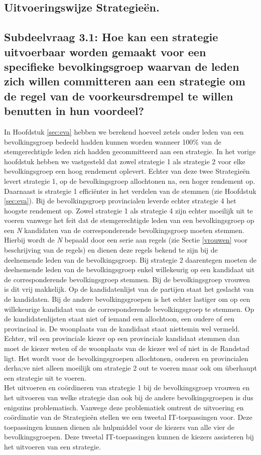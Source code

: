 \subsection{Uitvoeringswijze Strategie\"{e}n.}

\subsection*{Subdeelvraag 3.1: Hoe kan een strategie uitvoerbaar worden gemaakt voor een specifieke bevolkingsgroep waarvan de leden zich willen committeren aan een strategie om de regel van de voorkeursdrempel te willen benutten in hun voordeel?}
In Hoofdstuk \ref{sec:eva} hebben we berekend hoeveel zetels onder leden van een bevolkingsgroep bedeeld hadden kunnen worden wanneer 100\% van de stemgerechtigde leden zich hadden gecommitteerd aan een strategie. In het vorige hoofdstuk hebben we vastgesteld dat zowel strategie 1 als strategie 2 voor elke bevolkingsgroep een hoog rendement oplevert. Echter van deze twee Strategie\"{e}n levert strategie 1, op de bevolkingsgroep allochtonen na, een hoger rendement op. Daarnaast is strategie 1 effici\"{e}nter in het verdelen van de stemmen (zie Hoofdstuk \ref{sec:eva}). Bij de bevolkingsgroep provincialen leverde echter strategie 4 het hoogste rendement op. Zowel strategie 1 als strategie 4 zijn echter moeilijk uit te voeren vanwege het feit dat de stemgerechtigde leden van een bevolkingsgroep op een \textit{N} kandidaten van de corresponderende bevolkingsgroep moeten stemmen. Hierbij wordt de \textit{N} bepaald door een serie aan regels (zie Sectie \ref{vrouwen} voor beschrijving van de regels) en dienen deze regels bekend te zijn bij de deelnemende leden van de bevolkingsgroep. Bij strategie 2 daarentegen moeten de deelnemende leden van de bevolkingsgroep enkel willekeurig op een kandidaat uit de corresponderende bevolkingsgroep stemmen. Bij de bevolkingsgroep vrouwen is dit vrij makkelijk. Op de kandidatenlijst van de partijen staat het geslacht van de kandidaten. Bij de andere bevolkingsgroepen is het echter lastiger om op een willekeurige kandidaat van de corresponderende bevolkingsgroep te stemmen. Op de kandidatenlijsten staat niet of iemand een allochtoon, een oudere of een provinciaal is. De woonplaats van de kandidaat staat niettemin wel vermeld. Echter, wil een provinciale kiezer op een provinciale kandidaat stemmen dan moet de kiezer weten of de woonplaats van de kiezer wel of niet in de Randstad ligt. Het wordt voor de bevolkingsgroepen allochtonen, ouderen en provincialen derha;ve niet alleen moeilijk om strategie 2 out te voeren maar ook om \"{u}berhaupt een strategie uit te voeren. \\
\indent Het uitvoeren en co\"{o}rdineren van strategie 1 bij de bevolkingsgroep vrouwen en het uitvoeren van welke strategie dan ook bij de andere bevolkingsgroepen is dus enigszins problematisch. Vanwege deze problematiek omtrent de uitvoering en co\"{o}rdinatie van de Strategie\"{e}n stellen we een tweetal IT-toepassingen voor. Deze toepassingen kunnen dienen als hulpmiddel voor de kiezers van alle vier de bevolkingsgroepen. Deze tweetal IT-toepassingen kunnen de kiezers assisteren bij het uitvoeren van een strategie. 

